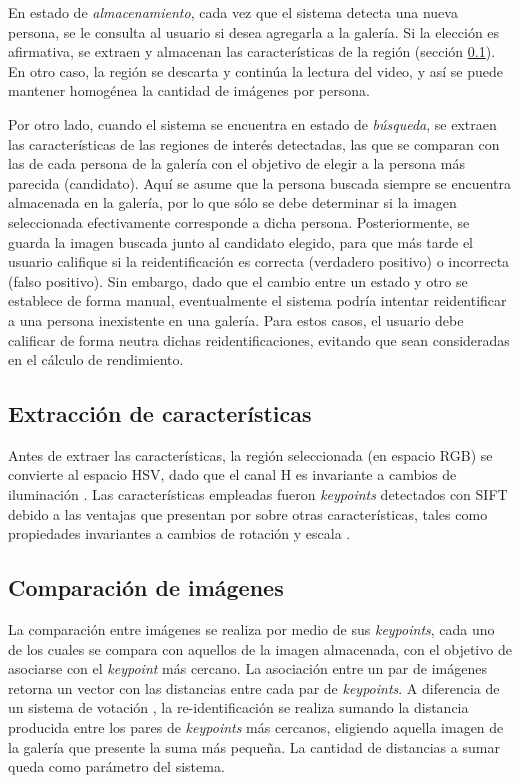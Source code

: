 \documentclass[../memoria.tex]{subfiles}
\begin{document}
En estado de \emph{almacenamiento}, cada vez que el sistema detecta una nueva persona, se le consulta al usuario si desea agregarla a la galería. Si la elección es afirmativa, se extraen y almacenan las características de la región (sección \ref{extraccion caracteristicas}). En otro caso, la región se descarta y continúa la lectura del video, y así se puede mantener homogénea la cantidad de imágenes por persona.

Por otro lado, cuando el sistema se encuentra en estado de \emph{búsqueda}, se extraen las características de las regiones de interés detectadas, las que se comparan con las de cada persona de la galería con el objetivo de elegir a la persona más parecida (candidato). Aquí se asume que la persona buscada siempre se encuentra almacenada en la galería, por lo que sólo se debe determinar si la imagen seleccionada efectivamente corresponde a dicha persona. Posteriormente, se guarda la imagen buscada junto al candidato elegido, para que más tarde el usuario califique si la reidentificación es correcta (verdadero positivo) o incorrecta (falso positivo). Sin embargo, dado que el cambio entre un estado y otro se establece de forma manual, eventualmente el sistema podría intentar reidentificar a una persona inexistente en una galería. Para estos casos, el usuario debe calificar de forma neutra dichas reidentificaciones, evitando que sean consideradas en el cálculo de rendimiento.

\subsection{Extracción de características} %
\label{extraccion caracteristicas}
Antes de extraer las características, la región seleccionada (en espacio RGB) se convierte al espacio HSV, dado que el canal H es invariante a cambios de iluminación \cite{farenzena2010person}. %
Las características empleadas fueron \emph{keypoints} detectados con SIFT debido a las ventajas que presentan por sobre otras características, tales como propiedades invariantes a cambios de rotación y escala \cite{lowe2004invariant}. %

\subsection{Comparación de imágenes}

La comparación entre imágenes se realiza por medio de sus \emph{keypoints}, cada uno de los cuales se compara con aquellos de la imagen almacenada, con el objetivo de asociarse con el \emph{keypoint} más cercano. La asociación entre un par de imágenes retorna un vector con las distancias entre cada par de \emph{keypoints}. A diferencia de un sistema de votación \cite{hamdoun2008person}, la re-identificación se realiza sumando la distancia producida entre los pares de \emph{keypoints} más cercanos, eligiendo aquella imagen de la galería que presente la suma más pequeña. La cantidad de distancias a sumar queda como parámetro del sistema.
\end{document}
